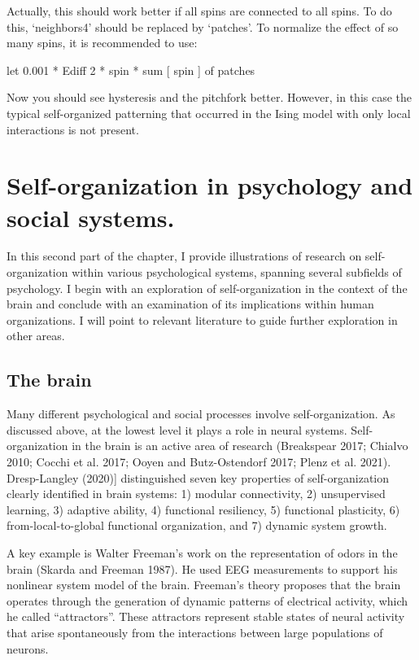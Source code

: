 \documentclass[
  a4paper,
  DIV=11,
  numbers=noendperiod,
  oneside]{scrreprt}
\begin{document}
Actually, this should work better if all spins are connected to all
spins. To do this, `neighbors4' should be replaced by `patches'. To
normalize the effect of so many spins, it is recommended to use:

{let} {0.001} {*} {Ediff} {2} {*} {spin} {* sum} {{[} spin {]}} {of
patches}

Now you should see hysteresis and the pitchfork better. However, in this
case the typical self-organized patterning that occurred in the Ising
model with only local interactions is not present.

\hypertarget{sec-Selforganization-in-psychology-and-social-systems}{%
\section{Self-organization in psychology and social
systems.}\label{sec-Selforganization-in-psychology-and-social-systems}}

In this second part of the chapter, I provide illustrations of research
on self-organization within various psychological systems, spanning
several subfields of psychology. I begin with an exploration of
self-organization in the context of the brain and conclude with an
examination of its implications within human organizations. I will point
to relevant literature to guide further exploration in other areas.

\hypertarget{sec-The-brain}{%
\subsection{The brain}\label{sec-The-brain}}

Many different psychological and social processes involve
self-organization. As discussed above, at the lowest level it plays a
role in neural systems. Self-organization in the brain is an active area
of research (Breakspear 2017; Chialvo 2010; Cocchi et al. 2017; Ooyen
and Butz-Ostendorf 2017; Plenz et al. 2021). Dresp-Langley (2020){]}
distinguished seven key properties of self-organization clearly
identified in brain systems: 1) modular connectivity, 2) unsupervised
learning, 3) adaptive ability, 4) functional resiliency, 5) functional
plasticity, 6) from-local-to-global functional organization, and 7)
dynamic system growth.

A key example is Walter Freeman's work on the representation of odors in
the brain (Skarda and Freeman 1987). He used EEG measurements to support
his nonlinear system model of the brain. Freeman's theory proposes that
the brain operates through the generation of dynamic patterns of
electrical activity, which he called ``attractors''. These attractors
represent stable states of neural activity that arise spontaneously from
the interactions between large populations of neurons.
\end{document}
